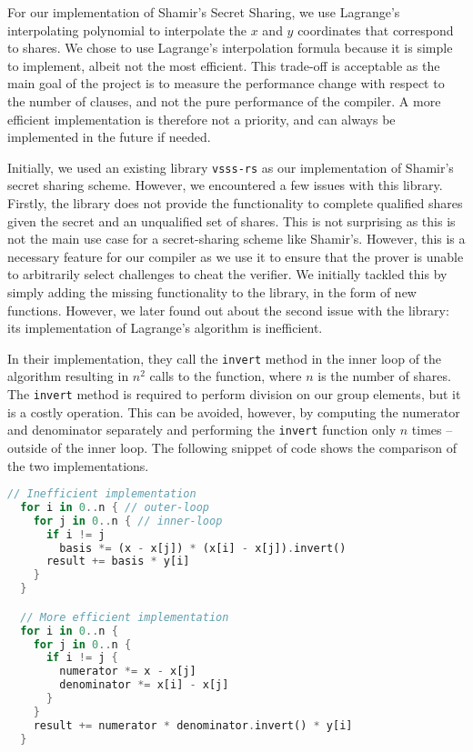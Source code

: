 For our implementation of Shamir's Secret Sharing, we use Lagrange's interpolating 
polynomial to interpolate the $x$ and $y$ coordinates that correspond to shares. We 
chose to use Lagrange's interpolation formula because it is simple to implement, 
albeit not the most efficient. This trade-off is acceptable as the main goal of the project 
is to measure the performance change with respect to the number of clauses, and 
not the pure performance of the compiler. A more efficient implementation is therefore 
not a priority, and can always be implemented in the future if needed. 

Initially, we used an existing library \texttt{vsss-rs} \cite{vsss-rs} as our implementation of 
Shamir's secret sharing scheme. However, we encountered a few issues with this library. Firstly, 
the library does not provide the functionality to complete qualified shares given the secret 
and an unqualified set of shares. This is not surprising as this is not the main use case for 
a secret-sharing scheme like Shamir's. However, this is a necessary feature for our compiler
as we use it to ensure that the prover is unable to arbitrarily select challenges to cheat the 
verifier. We initially tackled this by simply adding the missing functionality to the library, 
in the form of new functions. However, we later found out about the second issue with the library:
its implementation of Lagrange's algorithm is inefficient.

In their implementation, they call the \texttt{invert} 
method in the inner loop of the algorithm resulting in $n^2$ calls to the function, 
where $n$ is the number of shares. The \texttt{invert} method is required to perform 
division on our group elements, but it is a costly operation. 
This can be avoided, however, by computing the numerator and denominator 
separately and performing the \texttt{invert} function only $n$ times -- outside of the inner loop. 
The following snippet of code shows the comparison of the two implementations. 

\begin{lstlisting}[language=rust]
  // Inefficient implementation
  for i in 0..n { // outer-loop
    for j in 0..n { // inner-loop
      if i != j
        basis *= (x - x[j]) * (x[i] - x[j]).invert()
      result += basis * y[i]
    }
  }

  // More efficient implementation
  for i in 0..n {
    for j in 0..n {
      if i != j {
        numerator *= x - x[j]
        denominator *= x[i] - x[j]
      }
    }
    result += numerator * denominator.invert() * y[i]
  }
\end{lstlisting}

